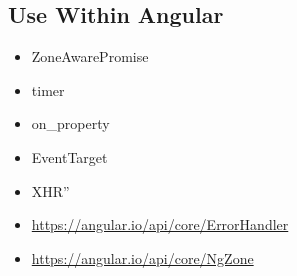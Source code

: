 \subsection{Use Within Angular}



\begin{itemize}
  \item ZoneAwarePromise
  \item timer
  \item on\_property
  \item EventTarget
  \item XHR”
\end{itemize}


\begin{itemize}
  \item \url{https://angular.io/api/core/ErrorHandler}
\end{itemize}





\begin{itemize}
  \item \url{https://angular.io/api/core/NgZone}
\end{itemize}

